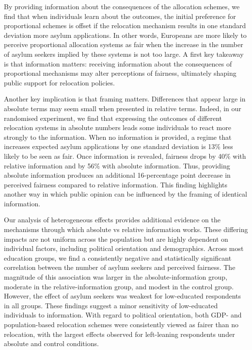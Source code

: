 \documentclass[
  12pt,
  a4paper,
]{article}
\begin{document}
By providing information about the consequences of the allocation schemes, we find that when individuals learn about the outcomes, the initial preference for proportional schemes is offset if the relocation mechanism results in one standard deviation more asylum applications. In other words, Europeans are more likely to perceive proportional allocation systems as fair when the increase in the number of asylum seekers implied by these systems is not too large. A first key takeaway is that information matters: receiving information about the consequences of proportional mechanisms may alter perceptions of fairness, ultimately shaping public support for relocation policies.

Another key implication is that framing matters. Differences that appear large in absolute terms may seem small when presented in relative terms. Indeed, in our randomised experiment, we find that expressing the outcomes of different relocation systems in absolute numbers leads some individuals to react more strongly to the information. When no information is provided, a regime that increases expected asylum applications by one standard deviation is 13\% less likely to be seen as fair. Once information is revealed, fairness drops by 40\% with relative information and by 56\% with absolute information. Thus, providing absolute information produces an additional 16-percentage point decrease in perceived fairness compared to relative information. This finding highlights another way in which public opinion can be influenced by the framing of identical information.

Our analysis of heterogeneous effects provides additional evidence on the mechanisms through which absolute vs relative information works. These differing impacts are not uniform across the population but are highly dependent on individual factors, including political orientation and demographics. Across most education groups, we find a consistently negative and statistically significant correlation between the number of asylum seekers and perceived fairness. The magnitude of this association was larger in the absolute-information group, moderate in the relative-information group, and modest in the control group. However, the effect of asylum seekers was weakest for low-educated respondents in all groups. These findings suggest a minor sensitivity of low-educated individuals to information. With regard to political orientation, both GDP- and population-based relocation schemes were consistently viewed as fairer than no relocation, with the largest effects observed for left-leaning respondents under absolute and control conditions.
\end{document}
